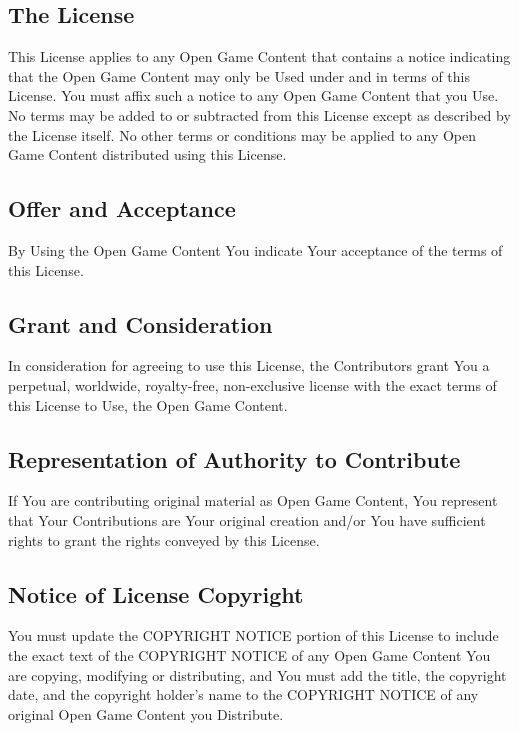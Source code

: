 \subsection{The License}

This License applies to any Open Game Content that contains a notice 
indicating that the Open Game Content may only be Used under and in terms of this 
License. You must affix such a notice to any Open Game Content that you Use. No 
terms may be added to or subtracted from this License except as described by the 
License itself. No other terms or conditions may be applied to any Open Game Content 
distributed using this License. 


\subsection{Offer and Acceptance}

By Using the Open Game Content You indicate Your acceptance 
of the terms of this License. 

\subsection{Grant and Consideration}

In consideration for agreeing to use this License, 
the Contributors grant You a perpetual, worldwide, royalty-free, non-exclusive 
license with the exact terms of this License to Use, the Open Game Content. 


\subsection{Representation of Authority to Contribute}

If You are contributing original material 
as Open Game Content, You represent that Your Contributions are Your original creation 
and/or You have sufficient rights to grant the rights conveyed by this License. 


\subsection{Notice of License Copyright}

You must update the COPYRIGHT NOTICE portion of 
this License to include the exact text of the COPYRIGHT NOTICE of any Open Game 
Content You are copying, modifying or distributing, and You must add the title, 
the copyright date, and the copyright holder's name to the COPYRIGHT NOTICE of 
any original Open Game Content you Distribute. 


